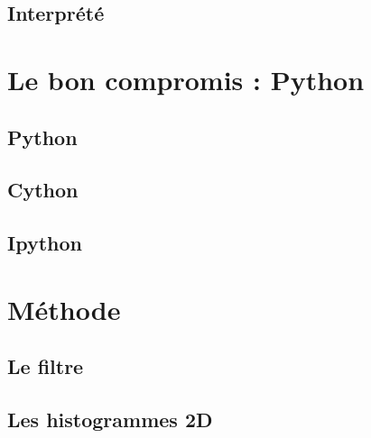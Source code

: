 \subsection{Interprété}

\section{Le bon compromis : Python}
\subsection{Python}
\subsection{Cython}
\subsection{Ipython}

\section{Méthode}
\subsection{Le filtre}
\subsection{Les histogrammes 2D}



